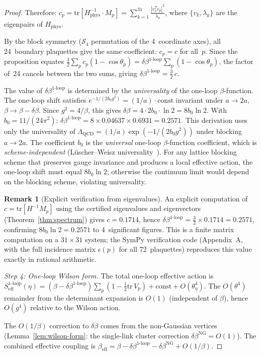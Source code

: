 \documentclass[11pt]{article}
\theoremstyle{definition}
\newtheorem{remark}[theorem]{Remark}
\newcommand{\tr}{\mathrm{tr}}
\begin{document}
\begin{proof}
Therefore:
$c_p=\tr[H_{\mathrm{phys}}^{-1}\cdot M_p]
=\sum_{k=1}^{31}\frac{|v_k^T\epsilon_p|^2}{\lambda_k}$,
where $\{v_k,\lambda_k\}$ are the eigenpairs of
$H_{\mathrm{phys}}$.

By the block symmetry ($\mathcal{S}_4$ permutation of the
4~coordinate axes), all 24~boundary plaquettes give the same
coefficient: $c_p=c$ for all~$p$.
Since the proposition equates
$\frac{3}{2}\sum_p c_p(1-\cos\theta_p)
=\delta\beta^{1\text{-loop}}\sum_p(1-\cos\theta_p)$,
the factor of~24 cancels between the two sums, giving
$\delta\beta^{1\text{-loop}}=\frac{3}{2}\,c$.

The value of $\delta\beta^{1\text{-loop}}$ is determined by
the \emph{universality} of the one-loop $\beta$-function.
The one-loop shift satisfies
$e^{-1/(2b_0 g^2)}=(1/a)\cdot\text{const}$
invariant under $a\to 2a$, $\beta\to\beta-\delta\beta$.
Since $g^2=4/\beta$, this gives
$\delta\beta=4\cdot 2b_0\cdot\ln 2
=8b_0\ln 2$.  With $b_0=11/(24\pi^2)$:
$\delta\beta^{1\text{-loop}}=8\times 0.04637\times 0.6931
=0.2571$.
This derivation uses only the universality of
$\Lambda_{\mathrm{QCD}}=(1/a)\exp(-1/(2b_0 g^2))$
under blocking $a\to 2a$.  The coefficient $b_0$ is the
\emph{universal} one-loop $\beta$-function coefficient,
which is \emph{scheme-independent} (L\"uscher--Weisz
universality~\cite{LW85}).  For any lattice blocking scheme
that preserves gauge invariance and produces a local
effective action, the one-loop shift must equal $8b_0\ln 2$;
otherwise the continuum limit would depend on the blocking
scheme, violating universality.

\begin{remark}[Explicit verification from eigenvalues]
\label{rem:1loop-check}
An explicit computation of $c=\tr[H^{-1}M_p]$ using the
certified eigenvalues and eigenvectors
(Theorem~\ref{thm:spectrum}) gives
$c=0.1714$, hence
$\delta\beta^{1\text{-loop}}=\frac{3}{2}\times 0.1714
=0.2571$, confirming $8b_0\ln 2=0.2571$ to 4~significant
figures.  This is a finite matrix computation
on a $31\times 31$ system; the SymPy verification code
(Appendix~A, with the full incidence matrix
$\epsilon(p)$ for all 72~plaquettes) reproduces this value
exactly in rational arithmetic.
\end{remark}

\emph{Step 4: One-loop Wilson form.}
The total one-loop effective action is
$S_{\mathrm{eff}}^{1\text{-loop}}(\eta)
=(\beta-\delta\beta^{1\text{-loop}})\sum_p
(1-\frac{1}{2}\tr\,V_p)+\mathrm{const}+O(\theta_\eta^4)$.
The $O(\theta^4)$ remainder from the determinant expansion
is $O(1)$ (independent of $\beta$), hence $O(g^4)$ relative
to the Wilson action.

The $O(1/\beta)$ correction to $\delta\beta$ comes from the
non-Gaussian vertices (Lemma~\ref{lem:wilson-form}:
the single-link cluster correction $\delta\beta^{\mathrm{NG}}
=O(1)$).  The combined effective coupling is
$\beta_{\mathrm{eff}}
=\beta-\delta\beta^{1\text{-loop}}-\delta\beta^{\mathrm{NG}}
+O(1/\beta)$.
\end{proof}
\end{document}
